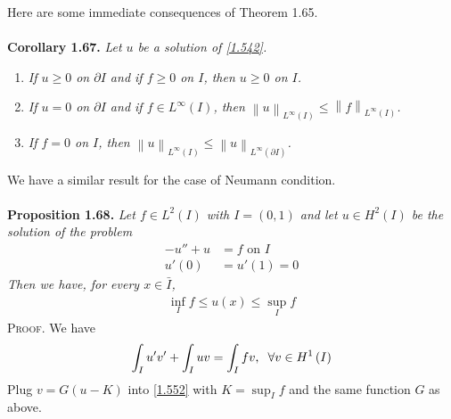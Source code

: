 \documentclass[a4paper,oneside]{book}
\numberwithin{equation}{chapter}
\begin{document}
Here are some immediate consequences of Theorem 1.65.\\
\\
\textbf{Corollary 1.67.} \textit{Let $u$ be a solution of \eqref{1.542}.}
\begin{enumerate}
\item \textit{If $u\ge 0$ on $\partial I$ and if $f\ge 0$ on $I$, then $u\ge 0$ on $I$.}
\item \textit{If $u=0$ on $\partial I$ and if $f\in L^{\infty}\left(I\right)$, then ${\left\| u \right\|_{{L^\infty }\left( I \right)}} \le {\left\| f \right\|_{{L^\infty }\left( I \right)}}$.}
\item \textit{If $f=0$ on $I$, then ${\left\| u \right\|_{{L^\infty }\left( I \right)}} \le {\left\| u \right\|_{{L^\infty }\left( {\partial I} \right)}}$.}
\end{enumerate}

We have a similar result for the case of Neumann condition.\\
\\
\textbf{Proposition 1.68.} \textit{Let $f\in L^2\left(I\right)$ with $I=\left(0,1\right)$ and let $u\in H^2\left(I\right)$ be the solution of the problem}
\begin{align}
\label{1.549}
 - u'' + u &= f\mbox{ on } I\\
u'\left( 0 \right) &= u'\left( 1 \right) = 0 \label{1.550}
\end{align}
\textit{Then we have, for every $x\in \bar I$,}
\begin{align}
\label{1.551}
\mathop {\inf }\limits_I f \le u\left( x \right) \le \mathop {\sup }\limits_I f
\end{align}
\textsc{Proof.} We have
\begin{align}
\label{1.552}
\int_I {u'v'}  + \int_I {uv}  = \int_I {fv} ,\hspace{0.2cm}\forall v \in {H^1}\left( I \right)
\end{align}
Plug $v=G\left(u-K\right)$ into \eqref{1.552} with $K=\sup _I f$ and the same function $G$ as above.
\end{document}
